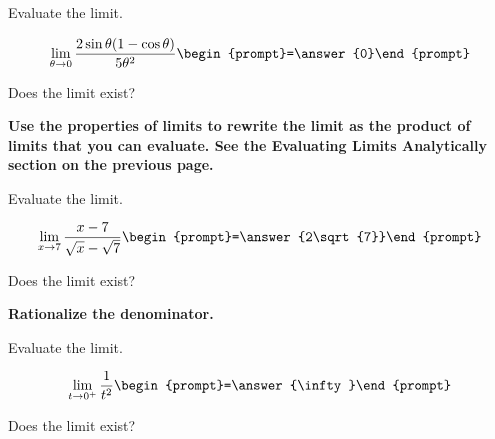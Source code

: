 \documentclass{ximera}
\begin{document}
\begin{problem}
Evaluate the limit.

\[ \lim_{\theta\to 0} \frac{2 \sin \theta (1-\cos \theta)}{5 \theta^2} \begin{prompt}=\answer{0}\end{prompt}\]



Does the limit exist?

\begin{multipleChoice}
  \end{multipleChoice}

\begin{hint}
\textbf{Use the properties of limits to rewrite the limit as the product of limits that you can evaluate.  See the 
Evaluating Limits Analytically section on the previous page.}
\end{hint}


\end{problem}


\begin{problem}
Evaluate the limit.

\[ \lim_{x\to 7} \frac{x-7}{\sqrt{x} - \sqrt{7}} \begin{prompt}=\answer{2\sqrt{7}}\end{prompt}\]


Does the limit exist?
\begin{multipleChoice}
  \end{multipleChoice}

\begin{hint}
\textbf{Rationalize the denominator.}
\end{hint}

\end{problem}


\begin{problem}
Evaluate the limit.

\[ \lim_{t\to 0^+} \frac{1}{t^2} \begin{prompt}=\answer{\infty}\end{prompt}\]


Does the limit exist?

\begin{multipleChoice}
  \end{multipleChoice}


\end{problem}
\end{document}

